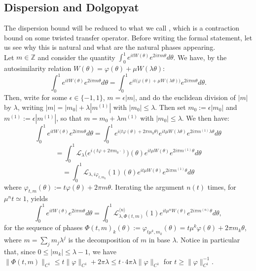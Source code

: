 \documentclass[11pt]{amsart}
\renewcommand{\phi}{\varphi}
\theoremstyle{plain}
\theoremstyle{definition}
\numberwithin{equation}{section}
\begin{document}
\subsection{Dispersion and Dolgopyat}

The dispersion bound will be reduced to what we call , which is a contraction bound on some twisted transfer operator. Before writing the formal statement, let us see why this is natural and what are the natural phases appearing.  \\

Let $m \in \mathbb{Z}$ and consider the quantity $ \int_0^1 e^{i t W(\theta)} e^{2 i \pi m \theta} d\theta$. We have, by the autosimilarity relation $W(\theta) = \varphi(\theta)+\mu W(\lambda \theta)$:
$$ \int_0^1 e^{i t W(\theta)} e^{2 i \pi m \theta} d\theta = \int_0^1 e^{i t \big(\varphi(\theta) + \mu W(\lambda \theta)\big) } e^{2 i \pi m \theta} d\theta . $$
Then, write for some $\epsilon \in \{-1,1\}$, $m=\epsilon |m| $, and do the euclidean division of $|m|$ by $\lambda$, writing $|m|=|m_0|+\lambda |m^{(1)}|$ with $|m_0| \leq \lambda$. Then set $m_0 := \epsilon |m_0|$ and $m^{(1)} := \epsilon |m^{(1)}|$, so that $m=m_0+\lambda m^{(1)}$ with $|m_0|\leq \lambda$. We then have: 
$$ \int_0^1 e^{i t W(\theta)} e^{2 i \pi m \theta} d\theta = \int_0^1 e^{i \big( t \varphi(\theta) + 2 \pi m_0 \theta \big) } e^{i t \mu W(\lambda \theta)} e^{2 i \pi m^{(1)} \lambda \theta} d\theta   $$
$$ = \int_0^1 \mathcal{L}_\lambda \Big(e^{i ( t \varphi + 2 \pi m_0 \cdot ) } \Big)(\theta) e^{i t \mu W(\theta)} e^{2 i \pi m^{(1)} \theta} d\theta  $$
$$ = \int_0^1 \mathcal{L}_{\lambda,i \phi_{t,m_0}}(1)(\theta) e^{i t \mu W(\theta)} e^{2 i \pi m^{(1)} \theta} d\theta  $$
where $\phi_{t,m}(\theta) := t\varphi(\theta)+2 \pi m \theta$. Iterating the argument $n(t)$ times, for $\mu^{n} t \simeq 1$, yields
\begin{equation} \label{e:tranappear}
\int_0^1 e^{i t W(\theta)} e^{2 i \pi m \theta} d\theta = \int_0^1 \mathcal{L}_{\lambda,\Phi(t,m)}^{\langle n \rangle}(1) e^{i t \mu^n W(\theta)} e^{2 i \pi m^{(n)} \theta} d\theta,
\end{equation}
for the sequence of phases $\Phi(t,m)_k(\theta) := \phi_{t \mu^k, m_k}(\theta) = t \mu^k \varphi(\theta) + 2 \pi m_k \theta$, where $m=\sum_{j} m_j \lambda^j$ is the decomposition of $m$ in base $\lambda$. Notice in particular that, since $0 \leq |m_k| \leq \lambda-1$, we have $\|\Phi(t,m)\|_{C^1} \leq t \|\varphi\|_{C^1} + 2 \pi \lambda \leq t \cdot 4\pi \lambda \|\varphi\|_{C^1} $ for $t \geq \|\varphi\|_{C^1}^{-1}$.  \\
\end{document}
